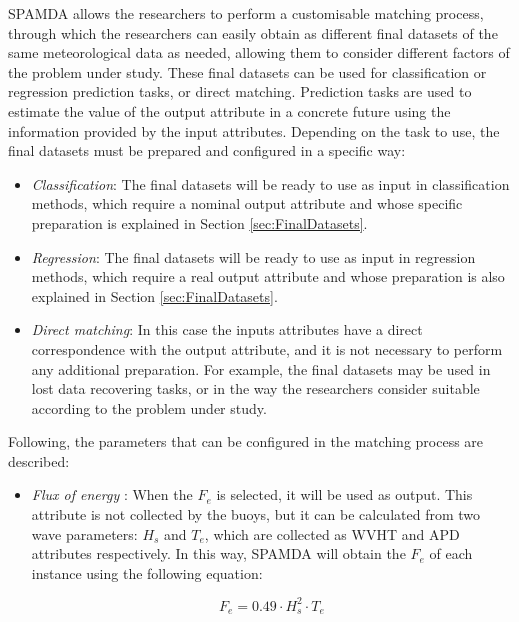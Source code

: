 \begin{onehalfspace}
				SPAMDA allows the researchers to perform a customisable matching process, through which the researchers can easily obtain as different final datasets of the same meteorological data as needed, allowing them to consider different factors of the problem under study. These final datasets can be used for classification or regression prediction tasks, or direct matching. Prediction tasks are used to estimate the value of the output attribute in a concrete future using the information provided by the input attributes. Depending on the task to use, the final datasets must be prepared and configured in a specific way:
				
				\begin{itemize}
					\item \textit{Classification}: The final datasets will be ready to use as input in classification methods, which require a nominal output attribute and whose specific preparation is explained in Section \ref{sec:FinalDatasets}.
					\item \textit{Regression}: The final datasets will be ready to use as input in regression methods, which require a real output attribute and whose preparation is also explained in Section \ref{sec:FinalDatasets}.
					\item \textit{Direct matching}: In this case the inputs attributes have a direct correspondence with the output attribute, and it is not necessary to perform any additional preparation. For example, the final datasets may be used in lost data recovering tasks, or in the way the researchers consider suitable according to the problem under study.
				\end{itemize}
				
				Following, the parameters that can be configured in the matching process are described:
				
				\begin{itemize}
				
					\item \textit{Flux of energy} \cite{FERNANDEZ201544}: When the $F_e$ is selected, it will be used as output. This attribute is not collected by the buoys, but it can be calculated from two wave parameters: $H_s$ and $T_e$, which are collected as WVHT and APD attributes respectively. In this way, SPAMDA will obtain the $F_e$ of each instance using the following equation:
					
						\begin{equation}
							F_e = 0.49 \cdot H^2_s \cdot T_e
							\label{eq:fluxOfEnergy}
						\end{equation}
					

\end{itemize}
\end{onehalfspace}
